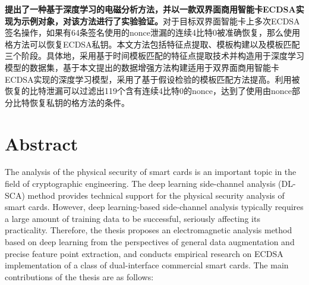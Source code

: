 \textbf{提出了一种基于深度学习的电磁分析方法，并以一款双界面商用智能卡ECDSA实现为示例对象，对该方法进行了实验验证。}对于目标双界面智能卡上多次ECDSA签名操作，如果有64条签名使用的nonce泄漏的连续4比特0被准确恢复，那么使用格方法可以恢复ECDSA私钥。本文方法包括特征点提取、模板构建以及模板匹配三个阶段。具体地，采用基于时间模板匹配的特征点提取技术并构造用于深度学习模型的数据集，基于本文提出的数据增强方法构建适用于双界面商用智能卡ECDSA实现的深度学习模型，采用了基于假设检验的模板匹配方法提高\zyx。利用被恢复的比特泄漏可以过滤出119个含有连续4比特0的nonce，达到了使用由nonce部分比特恢复私钥的格方法的条件。

\intobmk\chapter*{Abstract}%


The analysis of the physical security of smart cards is an important topic in the field of cryptographic engineering. The deep learning side-channel analysis (DL-SCA) method provides technical support for the physical security analysis of smart cards. However, deep learning-based side-channel analysis typically requires a large amount of training data to be successful, seriously affecting its practicality. Therefore, the thesis proposes an electromagnetic analysis method based on deep learning from the perspectives of general data augmentation and precise feature point extraction, and conducts empirical research on ECDSA implementation of a class of dual-interface commercial smart cards. The main contributions of the thesis are as follows:

